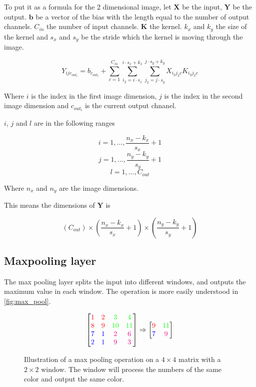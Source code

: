 To put it as a formula for the 2 dimensional image,
let $\bm{X}$ be the input,
$\bm{Y}$ be the output.
$\bm{b}$ be a vector of the bias with the length equal to the number of output channels.
$C_{in}$ the number of input channels.
$\bm{K}$ the kernel.
$k_x$ and $k_y$ the size of the kernel and $s_x$ and $s_y$ be the stride which the kernel is moving through the image.

$$Y_{ijc_{out_l}} = b_{c_{out_l}} + \sum^{C_{in}}_{c = 1} \sum^{i \cdot s_x + k_x}_{i_2 = i \cdot s_x} \sum^{j \cdot s_y + k_y}_{j_2 = j \cdot s_y} X_{i_2j_2c} K_{i_2j_2c} $$

Where $i$ is the index in the first image dimension, $j$ is the index in the second image dimension and $c_{out_l}$ is the current output chnanel.

$i$, $j$ and $l$ are in the following ranges

$$i = 1, ..., \frac{n_x - k_x}{s_x} + 1$$
$$j = 1, ..., \frac{n_y - k_y}{s_y} + 1$$
$$l = 1, ..., C_{out}$$

Where $n_x$ and $n_y$ are the image dimensions.

This means the dimensions of $\bm{Y}$ is

$$\left(C_{out}\right) \times \left(\frac{n_x - k_x}{s_x} + 1\right) \times \left(\frac{n_y - k_y}{s_y} + 1\right) $$

\subsection{Maxpooling layer}

The max pooling layer splits the input into different windows, and outputs the maximum value in each window. The operation is more easily understood in \autoref{fig:max_pool}.

\begin{figure}[htpb]
    \centering
    $$\begin{bmatrix}
        \color{red}1 & \color{red} 2 & \color{green} 3 & \color{green} 4 \\
        \color{red}8 & \color{red}9 & \color{green}10 & \color{green}11 \\
        \color{blue}7 & \color{blue}1 & \color{magenta}2 & \color{magenta}6 \\
        \color{blue}2 & \color{blue}1 & \color{magenta}9 & \color{magenta}3
        \end{bmatrix} \Rightarrow \begin{bmatrix}
        \color{red}9 & \color{green}11 \\
        \color{blue}7 & \color{magenta}9
        \end{bmatrix}$$
    \caption{Illustration of a max pooling operation on a $4\times 4$ matrix with a $2\times 2$ window. The window will process the numbers of the same color and output the same color.}
    \label{fig:max_pool}
\end{figure}

